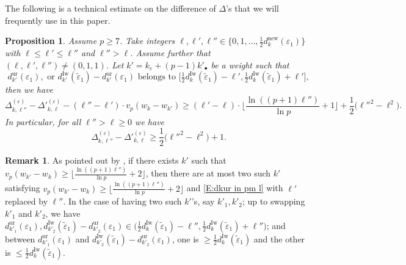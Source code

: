 \documentclass[12pt]{amsart}
\newtheorem{proposition}[subsection]{Proposition}
\theoremstyle{definition}
\newtheorem{remark}[subsection]{Remark}
\numberwithin{equation}{subsection}
\newcommand{\new}{\mathrm{new}}
\newcommand{\Iw}{\mathrm{Iw}}
\newcommand{\ur}{\mathrm{ur}}
\begin{document}
The following is a technical estimate \cite[Corollary~5.10]{liu-truong-xiao-zhao} on the difference of $\Delta$'s that we will frequently use in this paper.
\begin{proposition}
\label{P:Delta - Delta'}
Assume $p \geq 7$. Take integers $\ell, \ell', \ell'' \in \{0,1, \dots, \frac 12d_k^\new(\varepsilon_1)\}$ with $\ell \leq \ell'\leq  \ell''$ and $\ell''>\ell$. Assume further that $(\ell,\ell',\ell'')\neq (0,1,1)$.
Let $k' = k_\varepsilon + (p-1)k'_{\bullet}$ be a weight such that
\begin{equation}
\label{E:dkur in pm l}
d_{k'}^\ur(\varepsilon_1), \textrm{ or } d_{k'}^\Iw(\tilde \varepsilon_1) - d_{k'}^\ur(\varepsilon_1) \textrm{ belongs to } \big[\tfrac 12d_k^\Iw(\tilde \varepsilon_1)-\ell', \tfrac 12 d_k^\Iw(\tilde \varepsilon_1)+\ell'\big],
\end{equation}
then we have
$$
\Delta_{k, \ell''}^{(\varepsilon)}- \Delta'^{(\varepsilon)}_{k, \ell} - (\ell''-\ell') \cdot  v_p(w_k - w_{k'}) \geq (\ell'-\ell) \cdot \Big\lfloor \frac{\ln((p+1)\ell'')}{\ln p}+1\Big\rfloor + \frac 12\big( \ell''^2 - \ell^2\big).
$$
In particular, for all $\ell''>\ell\geq 0$ we have
\begin{equation}
\label{E:Delta - Delta' geq half of diff square}
\Delta_{k, \ell''}^{(\varepsilon)}- \Delta'^{(\varepsilon)}_{k, \ell} \geq \frac 12\big( \ell''^2 - \ell^2\big)+1.
\end{equation}
\end{proposition}
\begin{remark}
\label{R:two sides of wk'}
As pointed out by \cite[Corollary 5.10]{liu-truong-xiao-zhao}, if there exists $k'$ such that $v_p(w_{k'}-w_k) \geq \big\lfloor \frac{\ln((p+1)\ell'')}{\ln p}+2\big\rfloor $, then there are at most two such $k'$ satisfying $v_p(w_{k'}-w_k) \geq \big\lfloor \frac{\ln((p+1)\ell'')}{\ln p}+2\big\rfloor $ and \eqref{E:dkur in pm l} with $\ell'$ replaced by $\ell''$. In the case of having two such $k'$'s, say $k'_1, k'_2$; up to swapping $k'_1$ and $k'_2$, we have $d_{k'_1}^\ur( \varepsilon_1), d_{k'_2}^\Iw(\tilde \varepsilon_1)-d_{k'_2}^\ur( \varepsilon_1) \in \big(\frac 12d_k^\Iw(\tilde \varepsilon_1)-\ell'', \frac 12d_k^\Iw(\tilde \varepsilon_1)+\ell''\big)$; and between $d_{k'_1}^\ur( \varepsilon_1)$ and $ d_{k'_2}^\Iw(\tilde \varepsilon_1)-d_{k'_2}^\ur( \varepsilon_1)$, one is $ \geq \frac 12 d_k^\Iw(\tilde \varepsilon_1)$ and the other is $ \leq \frac 12 d_k^\Iw(\tilde \varepsilon_1)$. 
\end{remark}
\end{document}
